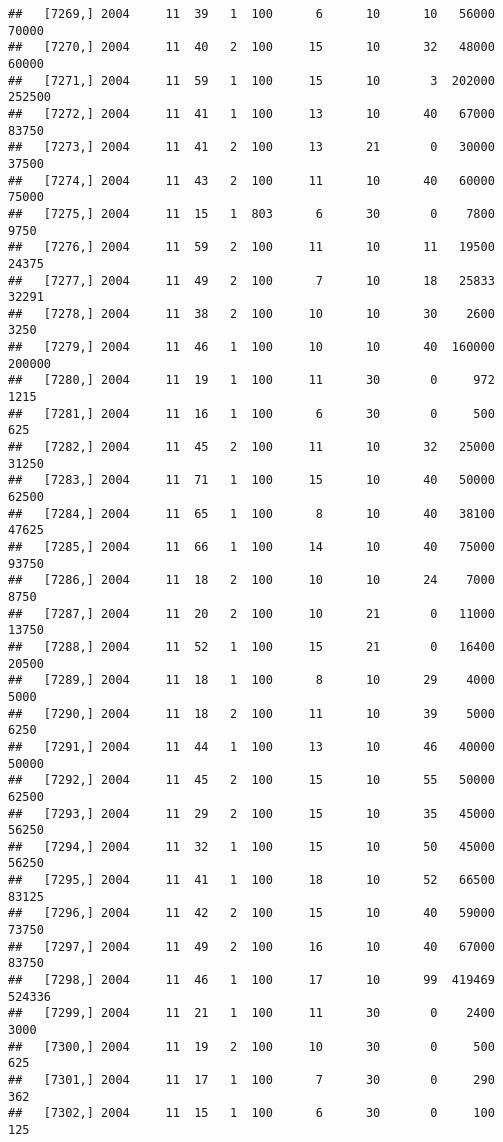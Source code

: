 \documentclass{article}\usepackage[]{graphicx}\usepackage[]{color}
\makeatletter
\newenvironment{kframe}{%
 \def\at@end@of@kframe{}%
 \ifinner\ifhmode%
  \def\at@end@of@kframe{\end{minipage}}%
  \begin{minipage}{\columnwidth}%
 \fi\fi%
 \def\FrameCommand##1{\hskip\@totalleftmargin \hskip-\fboxsep
 \colorbox{shadecolor}{##1}\hskip-\fboxsep
     \hskip-\linewidth \hskip-\@totalleftmargin \hskip\columnwidth}%
 \MakeFramed {\advance\hsize-\width
   \@totalleftmargin\z@ \linewidth\hsize
   \@setminipage}}%
 {\par\unskip\endMakeFramed%
 \at@end@of@kframe}
\newenvironment{knitrout}{}{} %
\makeatother
\begin{document}
\begin{knitrout}
\begin{kframe}
\begin{verbatim}
##   [7269,] 2004     11  39   1  100      6      10      10   56000   70000
##   [7270,] 2004     11  40   2  100     15      10      32   48000   60000
##   [7271,] 2004     11  59   1  100     15      10       3  202000  252500
##   [7272,] 2004     11  41   1  100     13      10      40   67000   83750
##   [7273,] 2004     11  41   2  100     13      21       0   30000   37500
##   [7274,] 2004     11  43   2  100     11      10      40   60000   75000
##   [7275,] 2004     11  15   1  803      6      30       0    7800    9750
##   [7276,] 2004     11  59   2  100     11      10      11   19500   24375
##   [7277,] 2004     11  49   2  100      7      10      18   25833   32291
##   [7278,] 2004     11  38   2  100     10      10      30    2600    3250
##   [7279,] 2004     11  46   1  100     10      10      40  160000  200000
##   [7280,] 2004     11  19   1  100     11      30       0     972    1215
##   [7281,] 2004     11  16   1  100      6      30       0     500     625
##   [7282,] 2004     11  45   2  100     11      10      32   25000   31250
##   [7283,] 2004     11  71   1  100     15      10      40   50000   62500
##   [7284,] 2004     11  65   1  100      8      10      40   38100   47625
##   [7285,] 2004     11  66   1  100     14      10      40   75000   93750
##   [7286,] 2004     11  18   2  100     10      10      24    7000    8750
##   [7287,] 2004     11  20   2  100     10      21       0   11000   13750
##   [7288,] 2004     11  52   1  100     15      21       0   16400   20500
##   [7289,] 2004     11  18   1  100      8      10      29    4000    5000
##   [7290,] 2004     11  18   2  100     11      10      39    5000    6250
##   [7291,] 2004     11  44   1  100     13      10      46   40000   50000
##   [7292,] 2004     11  45   2  100     15      10      55   50000   62500
##   [7293,] 2004     11  29   2  100     15      10      35   45000   56250
##   [7294,] 2004     11  32   1  100     15      10      50   45000   56250
##   [7295,] 2004     11  41   1  100     18      10      52   66500   83125
##   [7296,] 2004     11  42   2  100     15      10      40   59000   73750
##   [7297,] 2004     11  49   2  100     16      10      40   67000   83750
##   [7298,] 2004     11  46   1  100     17      10      99  419469  524336
##   [7299,] 2004     11  21   1  100     11      30       0    2400    3000
##   [7300,] 2004     11  19   2  100     10      30       0     500     625
##   [7301,] 2004     11  17   1  100      7      30       0     290     362
##   [7302,] 2004     11  15   1  100      6      30       0     100     125

\end{verbatim}
\end{kframe}
\end{knitrout}
\end{document}

